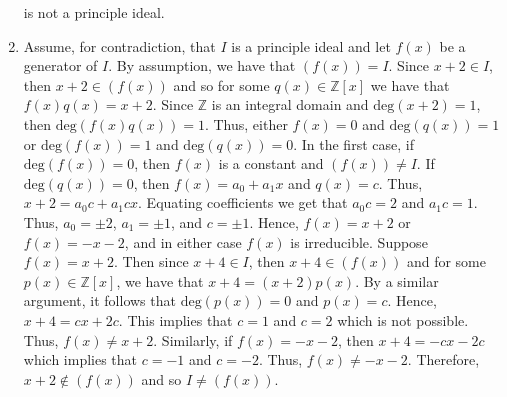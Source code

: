 \documentclass[12pt]{article}
\makeatletter
\theoremstyle{definition}
\theoremstyle{remark}
\renewenvironment{proof}[1][\proofname]{\par
  \pushQED{\qed}%
  \normalfont \topsep6\p@\@plus6\p@\relax
  \list{}{\leftmargin=0mm
          \rightmargin=4mm
          \settowidth{\itemindent}{\itshape#1}%
          \labelwidth=\itemindent
          \parsep=0pt \listparindent=\parindent 
  }
  \item[\hskip\labelsep
        \itshape
    #1\@addpunct{.}]\ignorespaces
}{%
  \popQED\endlist\@endpefalse
}
\let\oldproofname=\proofname
\renewcommand{\proofname}{\bf{\textit{\oldproofname}}}
\makeatother
\begin{document}
\begin{enumerate}[leftmargin=*]
        is not a principle ideal.
            \begin{proof}
                Assume, for contradiction, that $I$ is a principle ideal and let $f(x)$ be a generator of $I$. By assumption, we have that $(f(x))=I$. Since $x+2\in I$, then $x+2\in(f(x))$ and so for some $q(x)\in\mathbb{Z}[x]$ we have that $f(x)q(x)=x+2$. Since $\mathbb{Z}$ is an integral domain and $\text{deg}(x+2)=1$, then $\text{deg}(f(x)q(x))=1$. Thus, either $f(x)=0$ and $\text{deg}(q(x))=1$ or $\text{deg}(f(x))=1$ and $\text{deg}(q(x))=0$. In the first case, if $\text{deg}(f(x))=0$, then $f(x)$ is a constant and $(f(x))\neq I$. If $\text{deg}(q(x))=0$, then $f(x)=a_0+a_1x$ and $q(x)=c$. Thus, $x+2=a_0c+a_1cx$. Equating coefficients we get that $a_0c=2$ and $a_1c=1$. Thus, $a_0=\pm 2$, $a_1=\pm 1$, and $c=\pm 1$. Hence, $f(x)=x+2$ or $f(x)=-x-2$, and in either case $f(x)$ is irreducible. Suppose $f(x)=x+2$. Then since $x+4\in I$, then $x+4\in(f(x))$ and for some $p(x)\in\mathbb{Z}[x]$, we have that $x+4=(x+2)p(x)$. By a similar argument, it follows that $\text{deg}(p(x))=0$ and $p(x)=c$. Hence, $x+4=cx+2c$. This implies that $c=1$ and $c=2$ which is not possible. Thus, $f(x)\neq x+2$. Similarly, if $f(x)=-x-2$, then $x+4=-cx-2c$ which implies that $c=-1$ and $c=-2$. Thus, $f(x)\neq -x-2$. Therefore, $x+2\notin (f(x))$ and so $I\neq(f(x))$.
            \end{proof}
            

\end{enumerate}
\end{document}
